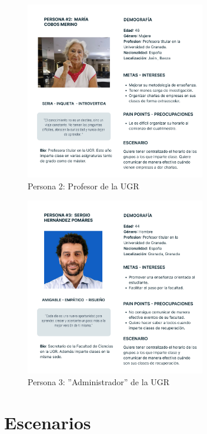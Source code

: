\begin{figure}[H]
    \centering
    \includegraphics[width=0.7\textwidth]{figures/04_persona_2.png}
    \caption{Persona 2: Profesor de la UGR}
    \label{fig:persona_2}
\end{figure}

\begin{figure}[H]
    \centering
    \includegraphics[width=0.7\textwidth]{figures/04_persona_3.png}
    \caption{Persona 3: ''Administrador'' de la UGR}
    \label{fig:persona_3}
\end{figure}

\section{Escenarios}

